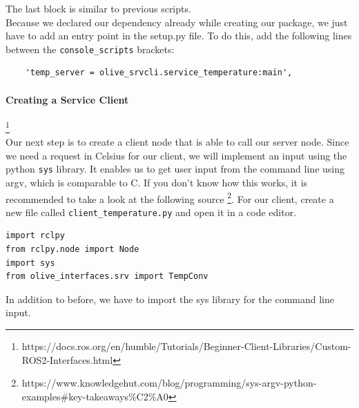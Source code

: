 \documentclass{article}
\begin{document}
\noindent
The last block is similar to previous scripts. \\
Because we declared our dependency already while creating our package, we just have to add an entry point in the setup.py file. To do this, add the following lines between the \texttt{console\_scripts} brackets:

\begin{lstlisting}
    'temp_server = olive_srvcli.service_temperature:main',
\end{lstlisting}


\paragraph{Creating a Service Client}\footnote{https://docs.ros.org/en/humble/Tutorials/Beginner-Client-Libraries/Custom-ROS2-Interfaces.html}~\\

\noindent
Our next step is to create a client node that is able to call our server node. Since we need a request in Celsius for our client, we will implement an input using the python \texttt{sys} library. It enables us to get user input from the command line using argv, which is comparable to C. If you don't know how this works, it is recommended to take a look at the following source \footnote{https://www.knowledgehut.com/blog/programming/sys-argv-python-examples\#key-takeaways\%C2\%A0 }. For our client, create a new file called \texttt{client\_temperature.py} and open it in a code editor.

\begin{verbatim}
import rclpy
from rclpy.node import Node
import sys
from olive_interfaces.srv import TempConv    
\end{verbatim}

\noindent
In addition to before, we have to import the sys library for the command line input.
\end{document}
